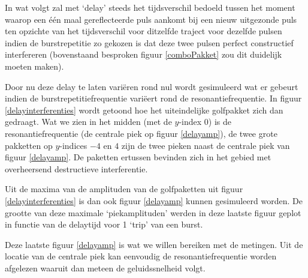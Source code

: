 
In wat volgt zal met `delay' steeds het tijdsverschil bedoeld tussen het 
moment waarop een \'e\'en maal gereflecteerde puls aankomt bij een nieuw 
uitgezonde puls ten opzichte van het tijdsverschil voor ditzelfde traject 
voor dezelfde pulsen indien de burstrepetitie zo gekozen is dat deze twee 
pulsen perfect constructief interfereren (bovenstaand besproken figuur 
\ref{comboPakket} zou dit duidelijk moeten maken).

Door nu deze delay te laten vari\"eren rond nul wordt gesimuleerd wat er 
gebeurt indien de burstrepetitiefrequentie vari\"eert rond de 
resonantiefrequentie. In figuur \ref{delayinterferenties} wordt getoond hoe 
het uiteindelijke golfpakket zich dan gedraagt. Wat we zien in het midden 
(met de $y$-index 0) is de resonantiefrequentie (de centrale piek op figuur 
\ref{delayamp}), de twee grote pakketten op $y$-indices $-4$ en $4$ zijn de 
twee pieken naast de centrale piek van figuur \ref{delayamp}. De paketten 
ertussen bevinden zich in het gebied met overheersend destructieve 
interferentie.


Uit de maxima van de amplituden van de golfpaketten uit figuur 
\ref{delayinterferenties} is dan ook figuur \ref{delayamp} kunnen 
gesimuleerd worden. De grootte van deze maximale `piekamplituden' werden in 
deze laatste figuur geplot in functie van de delaytijd voor 1 `trip' van 
een burst.

Deze laatste figuur \ref{delayamp} is wat we willen bereiken met de 
metingen. Uit de locatie van de centrale piek kan eenvoudig de 
resonantiefrequentie worden afgelezen waaruit dan meteen de geluidssnelheid 
volgt.


